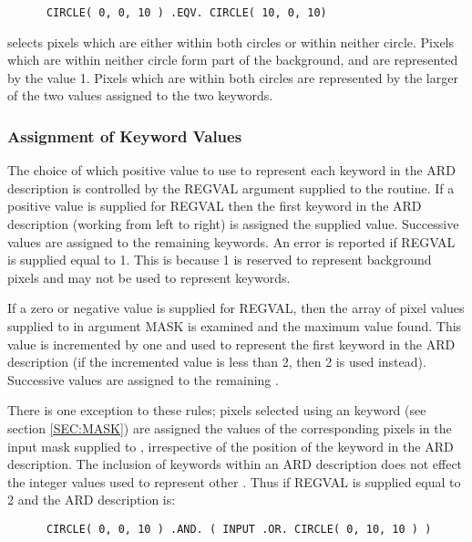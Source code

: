 \small
\begin{verbatim}
      CIRCLE( 0, 0, 10 ) .EQV. CIRCLE( 10, 0, 10)
\end{verbatim}
\normalsize

selects pixels which are either within both circles or within neither circle.
Pixels which are within neither circle form part of the background, and are
represented by the value 1. Pixels which are within both circles are represented
by the larger of the two values assigned to the two keywords. 

\subsubsection{Assignment of Keyword Values}
The choice of which positive value to use to represent each keyword in the ARD
description is controlled by the REGVAL argument supplied to the 
routine. If a positive value is supplied for REGVAL then the first keyword in the
ARD description (working from left to right) is assigned the supplied value.
Successive values are assigned to the remaining keywords. An error is reported
if REGVAL is supplied equal to 1. This is because 1 is reserved to represent
background pixels and may not be used to represent keywords. 

If a zero or negative value is supplied for REGVAL, then the array of pixel
values supplied to  in argument MASK is examined and the maximum value
found. This value is incremented by one and used to represent the first keyword
in the ARD description (if the incremented value is less than 2, then 2 is used
instead). Successive values are assigned to the remaining . 

There is one exception to these rules; pixels selected using an  keyword
(see section \ref{SEC:MASK}) are assigned the values of the corresponding pixels
in the input mask supplied to , irrespective of the position of the
 keyword in the ARD description. The inclusion of  keywords within an
ARD description does not effect the integer values used to represent other
. Thus if REGVAL is supplied equal to 2 and the ARD description is: 

\small
\begin{verbatim}
      CIRCLE( 0, 0, 10 ) .AND. ( INPUT .OR. CIRCLE( 0, 10, 10 ) )
\end{verbatim}
\normalsize

